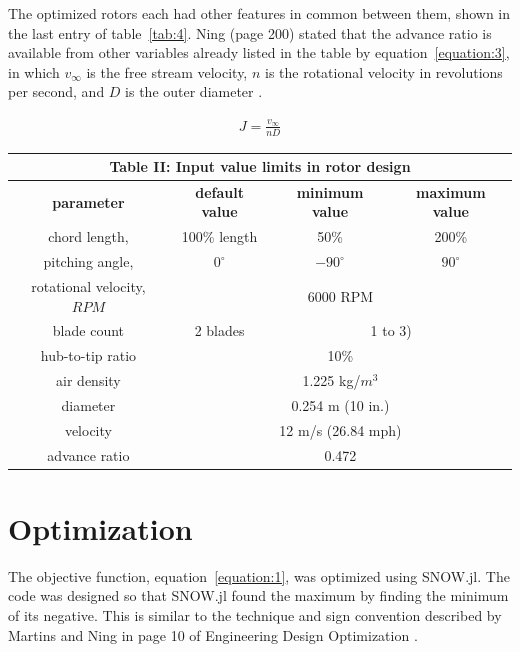 \documentclass[journal ]{new-aiaa}
\begin{document}
The optimized rotors each had other features in common between them, shown in the last entry of table~\eqref{tab:4}. Ning (page 200) stated that the advance ratio is available from other variables already listed in the table by equation~\eqref{equation:3}, in which $v_{\infty}$ is the free stream velocity, $n$ is the rotational velocity in revolutions per second, and $D$ is the outer diameter \cite{ComAer}.

\begin{equation}
	\begin{aligned}
	\label{equation:3}
	J = \frac{v_{\infty}}{n D}
	\end{aligned}
\end{equation}

\begin{center}
\begin{tabular}{| c | c | c | c |}
	\multicolumn{4}{c}{Table II: Input value limits in rotor design} \\ \hline
  	 \textbf{parameter} & \textbf{default value} & \textbf{minimum value} & \textbf{maximum value} \\ \hline
	 chord length, & 100\% length & 50\% & 200\% \\ \hline
	 pitching angle, & $0^{\circ}$ & $-90^{\circ}$ & $90^{\circ}$ \\ \hline \hline
	 rotational velocity, $RPM$ & \multicolumn{3}{c|}{6000 RPM} \\ \hline
	 blade count & 2 blades & \multicolumn{2}{c|}{1 to 3)}\\ \hline
	 hub-to-tip ratio & \multicolumn{3}{c|}{10\%} \\ \hline
	 air density & \multicolumn{3}{c|}{1.225 kg/$m^{3}$} \\ \hline
	 diameter & \multicolumn{3}{c|}{0.254 m (10 in.)} \\ \hline
	 velocity & \multicolumn{3}{c|}{12 m/s (26.84 mph)} \\ \hline
	 advance ratio & \multicolumn{3}{c|}{0.472} \\ \hline
\end{tabular}
\label{tab:4}
\end{center}

\section{Optimization}

The objective function, equation~\eqref{equation:1}, was optimized using SNOW.jl. The code was designed so that SNOW.jl found the maximum by finding the minimum of its negative. This is similar to the technique and sign convention described by Martins and Ning in page 10 of Engineering Design Optimization \cite{EngDesOpt}.
\end{document}

